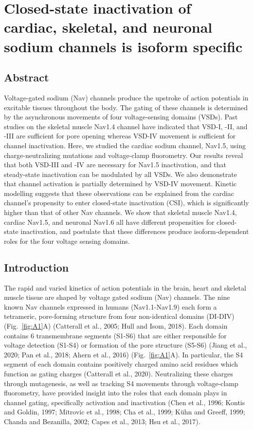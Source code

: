 \chapter{Closed-state inactivation of cardiac, skeletal, and neuronal sodium channels is isoform specific}
\label{sec:Nav}

\renewcommand{\thefigure}{A.\arabic{figure}}
\renewcommand{\figurename}{Fig.}
\setcounter{figure}{0}

\section{Abstract}
Voltage-gated sodium (Nav) channels produce the upstroke of action potentials in excitable tissues throughout the body. The gating of these channels is determined by the asynchronous movements of four voltage-sensing domains (VSDs). Past studies on the skeletal muscle Nav1.4 channel have indicated that VSD-I, -II, and -III are sufficient for pore opening whereas VSD-IV movement is sufficient for channel inactivation. Here, we studied the cardiac sodium channel, Nav1.5, using charge-neutralizing mutations and voltage-clamp fluorometry. Our results reveal that both VSD-III and -IV are necessary for Nav1.5 inactivation, and that steady-state inactivation can be modulated by all VSDs. We also demonstrate that channel activation is partially determined by VSD-IV movement. Kinetic modelling suggests that these observations can be explained from the cardiac channel’s propensity to enter closed-state inactivation (CSI), which is significantly higher than that of other Nav channels. We show that skeletal muscle Nav1.4, cardiac Nav1.5, and neuronal Nav1.6 all have different propensities for closed-state inactivation, and postulate that these differences produce isoform-dependent roles for the four voltage sensing domains.

\section{Introduction}
The rapid and varied kinetics of action potentials in the brain, heart and skeletal muscle tissue are shaped by voltage gated sodium (Nav) channels. The nine known Nav channels expressed in humans (Nav1.1-Nav1.9) each form a tetrameric, pore-forming structure from four non-identical domains (DI-DIV) (Fig.~\ref{fig:A1}A) (Catterall et al., 2005; Hull and Isom, 2018). Each domain contains 6 transmembrane segments (S1-S6) that are either responsible for voltage detection (S1-S4) or formation of the pore structure (S5-S6) (Jiang et al., 2020; Pan et al., 2018; Ahern et al., 2016) (Fig.~\ref{fig:A1}A). In particular, the S4 segment of each domain contains positively charged amino acid residues which function as gating charges (Catterall et al., 2020). Neutralizing these charges through mutagenesis, as well as tracking S4 movements through voltage-clamp fluorometry, have provided insight into the roles that each domain plays in channel gating, specifically activation and inactivation (Chen et al., 1996; Kontis and Goldin, 1997; Mitrovic et al., 1998; Cha et al., 1999; Kühn and Greeff, 1999; Chanda and Bezanilla, 2002; Capes et al., 2013; Hsu et al., 2017).

